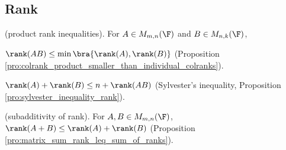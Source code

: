 \subsection{Rank}

(product rank inequalities). For $A\in M_{m,n}(\F)$ and $B\in M_{n,k}(\F)$,
\ben
\item [(i)] $\rank(AB) \leq \min\bra{\rank(A), \rank(B)}$ (Proposition \ref{pro:colrank_product_smaller_than_individual_colranks}).
\item [(ii)] $\rank(A) + \rank(B) \leq n + \rank(AB)$ (Sylvester's inequality, Proposition \ref{pro:sylvester_inequality_rank}).
\een





(subadditivity of rank). For $A,B\in M_{m,n}(\F)$, $\rank(A+B) \leq \rank(A) + \rank(B)$ (Proposition \ref{pro:matrix_sum_rank_leq_sum_of_ranks}). 


